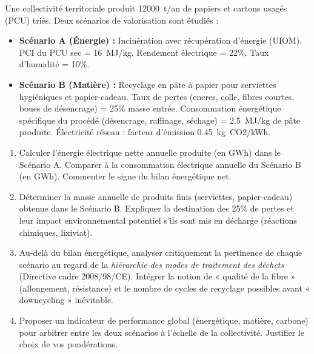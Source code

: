 \documentclass[11pt]{article}
\begin{document}
\begin{exercice}
Une collectivité territoriale produit \SI{12000}{t/an} de papiers et cartons usagés (PCU) triés. Deux scénarios de valorisation sont étudiés :
\begin{itemize}
    \item \textbf{Scénario A (Énergie) :} Incinération avec récupération d'énergie (UIOM). PCI du PCU sec = \SI{16}{MJ/kg}. Rendement électrique = 22\%. Taux d'humidité = 10\%.
    \item \textbf{Scénario B (Matière) :} Recyclage en pâte à papier pour serviettes hygiéniques et papier-cadeau. Taux de pertes (encres, colle, fibres courtes, boues de désencrage) = 25\% masse entrée. Consommation énergétique spécifique du procédé (désencrage, raffinage, séchage) = \SI{2.5}{MJ/kg} de pâte produite. Électricité réseau : facteur d'émission \SI{0.45}{kg~CO2/kWh}.
\end{itemize}
\begin{enumerate}
    \item Calculer l'énergie électrique nette annuelle produite (en GWh) dans le Scénario A. Comparer à la consommation électrique annuelle du Scénario B (en GWh). Commenter le signe du bilan énergétique net.
    \item Déterminer la masse annuelle de produits finis (serviettes, papier-cadeau) obtenue dans le Scénario B. Expliquer la destination des 25\% de pertes et leur impact environnemental potentiel s'ils sont mis en décharge (réactions chimiques, lixiviat).
    \item Au-delà du bilan énergétique, analyser critique\-ment la pertinence de chaque scénario au regard de la \textit{hiérarchie des modes de traitement des déchets} (Directive cadre 2008/98/CE). Intégrer la notion de « qualité de la fibre » (allongement, résistance) et le nombre de cycles de recyclage possibles avant « downcycling » inévitable.
    \item Proposer un indicateur de performance global (énergétique, matière, carbone) pour arbitrer entre les deux scénarios à l'échelle de la collectivité. Justifier le choix de vos pondérations.
\end{enumerate}
\end{exercice}
\end{document}
